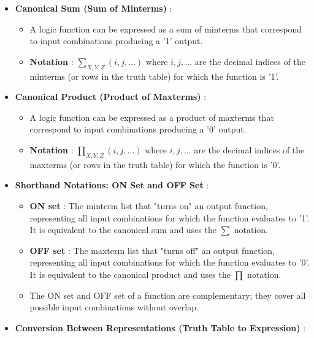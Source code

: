 \documentclass{article}
\begin{document}
\begin{itemize}
\begin{itemize}
\begin{itemize}
        \end{itemize}
    \item \textbf{Canonical Sum (Sum of Minterms)} :
    
        \begin{itemize}
            \item A logic function can be expressed as a sum of minterms that correspond to input combinations producing a '1' output.
            \item \textbf{Notation} : $\sum_{X,Y,Z}(i,j,...)$ where $i,j,...$ are the decimal indices of the minterms (or rows in the truth table) for which the function is '1'.
        \end{itemize}
    \item \textbf{Canonical Product (Product of Maxterms)} :
    
        \begin{itemize}
            \item A logic function can be expressed as a product of maxterms that correspond to input combinations producing a '0' output.
            \item \textbf{Notation} : $\prod_{X,Y,Z}(i,j,...)$ where $i,j,...$ are the decimal indices of the maxterms (or rows in the truth table) for which the function is '0'.
        \end{itemize}
    \item \textbf{Shorthand Notations: ON Set and OFF Set} :
    
        \begin{itemize}
            \item \textbf{ON set} : The minterm list that "turns on" an output function, representing all input combinations for which the function evaluates to '1'. It is equivalent to the canonical sum and uses the $\sum$ notation.
            \item \textbf{OFF set} : The maxterm list that "turns off" an output function, representing all input combinations for which the function evaluates to '0'. It is equivalent to the canonical product and uses the $\prod$ notation.
            \item The ON set and OFF set of a function are complementary; they cover all possible input combinations without overlap.
        \end{itemize}
    \item \textbf{Conversion Between Representations (Truth Table to Expression)} :
    

\end{itemize}
\end{itemize}
\end{document}
